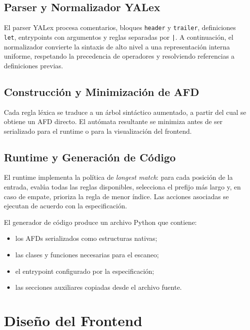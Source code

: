 \documentclass[12pt,a4paper]{article}
\begin{document}
\subsection{Parser y Normalizador YALex}

El parser YALex procesa comentarios, bloques \texttt{header} y \texttt{trailer}, definiciones \texttt{let}, entrypoints con argumentos y reglas separadas por \texttt{|}. A continuación, el normalizador convierte la sintaxis de alto nivel a una representación interna uniforme, respetando la precedencia de operadores y resolviendo referencias a definiciones previas.

\subsection{Construcción y Minimización de AFD}

Cada regla léxica se traduce a un árbol sintáctico aumentado, a partir del cual se obtiene un AFD directo. El autómata resultante se minimiza antes de ser serializado para el runtime o para la visualización del frontend.

\subsection{Runtime y Generación de Código}

El runtime implementa la política de \emph{longest match}: para cada posición de la entrada, evalúa todas las reglas disponibles, selecciona el prefijo más largo y, en caso de empate, prioriza la regla de menor índice. Las acciones asociadas se ejecutan de acuerdo con la especificación.

El generador de código produce un archivo Python que contiene:

\begin{itemize}[leftmargin=2em]
  \item los AFDs serializados como estructuras nativas;
  \item las clases y funciones necesarias para el escaneo;
  \item el entrypoint configurado por la especificación;
  \item las secciones auxiliares copiadas desde el archivo fuente.
\end{itemize}

\section{Diseño del Frontend}
\end{document}
